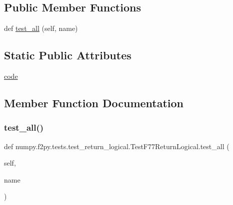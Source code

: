 \subsection*{Public Member Functions}
\begin{DoxyCompactItemize}
\item 
def \hyperlink{classnumpy_1_1f2py_1_1tests_1_1test__return__logical_1_1TestF77ReturnLogical_abf29c7ef63b1915eb63694716b7a8257}{test\+\_\+all} (self, name)
\end{DoxyCompactItemize}
\subsection*{Static Public Attributes}
\begin{DoxyCompactItemize}
\item 
\hyperlink{classnumpy_1_1f2py_1_1tests_1_1test__return__logical_1_1TestF77ReturnLogical_abf0fa48e66442e78941f6441858d138a}{code}
\end{DoxyCompactItemize}


\subsection{Member Function Documentation}
\mbox{\label{classnumpy_1_1f2py_1_1tests_1_1test__return__logical_1_1TestF77ReturnLogical_abf29c7ef63b1915eb63694716b7a8257}} 
\subsubsection{\texorpdfstring{test\+\_\+all()}{test\_all()}}
{\footnotesize\ttfamily def numpy.\+f2py.\+tests.\+test\+\_\+return\+\_\+logical.\+Test\+F77\+Return\+Logical.\+test\+\_\+all (\begin{DoxyParamCaption}\item[{}]{self,  }\item[{}]{name }\end{DoxyParamCaption})}



